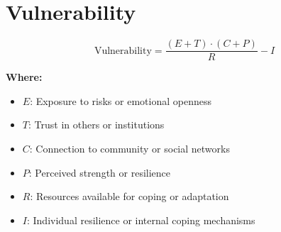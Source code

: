 \chapter{Vulnerability}

\begin{equation}
\text{Vulnerability} = \frac{(E + T) \cdot (C + P)}{R} - I
\end{equation}

\textbf{Where:}

\begin{itemize}
    \item $E$: Exposure to risks or emotional openness
    \item $T$: Trust in others or institutions
    \item $C$: Connection to community or social networks
    \item $P$: Perceived strength or resilience
    \item $R$: Resources available for coping or adaptation
    \item $I$: Individual resilience or internal coping mechanisms
\end{itemize}